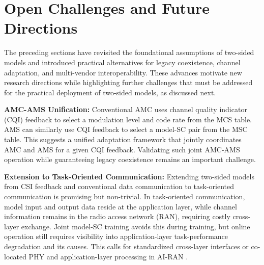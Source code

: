 \documentclass[10pt,twocolumn]{IEEEtran}
\begin{document}
\section{Open Challenges and Future Directions}
The preceding sections have revisited the foundational assumptions of two-sided models and introduced practical alternatives for legacy coexistence, channel adaptation, and multi-vendor interoperability. These advances motivate new research directions while highlighting further challenges that must be addressed for the  practical deployment of two-sided models, as discussed next.

\vspace{1mm}
{\bf AMC-AMS Unification:} Conventional AMC uses channel quality indicator (CQI) feedback to select a modulation level and code rate from the MCS table. AMS can similarly use CQI feedback to select a model-SC pair from the MSC table. This suggests a unified adaptation framework that jointly coordinates AMC and AMS for a given CQI feedback. Validating such joint AMC-AMS operation while guaranteeing legacy coexistence remains an important challenge.




\vspace{1mm}
{\bf Extension to Task-Oriented Communication:} 
Extending two-sided models from CSI feedback and conventional data communication to task-oriented communication is promising but non-trivial. In task-oriented communication, model input and output data reside at the application layer, while channel information remains in the radio access network (RAN), requiring costly cross-layer exchange. Joint model-SC training avoids this during training, but online operation still requires visibility into application-layer task-performance degradation and its causes. This calls for standardized cross-layer interfaces or co-located PHY and application-layer processing in AI-RAN \cite{airan2026architecture}.
\end{document}
